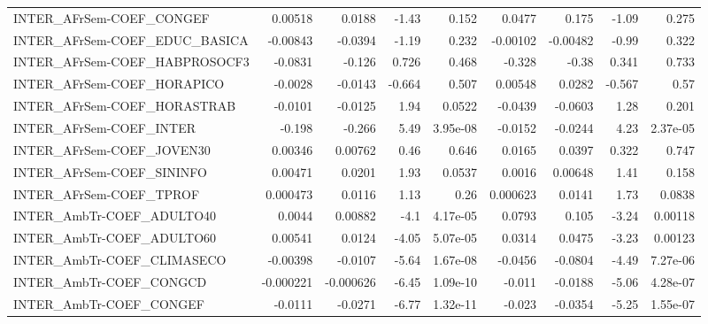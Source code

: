 \begin{tabular}{lrrrrrrrr}
INTER\_AFrSem-COEF\_CONGEF               &     0.00518 &       0.0188 &    -1.43 &    0.152 &     0.0477 &       0.175 &        -1.09 &         0.275 \\
INTER\_AFrSem-COEF\_EDUC\_BASICA          &    -0.00843 &      -0.0394 &    -1.19 &    0.232 &   -0.00102 &    -0.00482 &        -0.99 &         0.322 \\
INTER\_AFrSem-COEF\_HABPROSOCF3          &     -0.0831 &       -0.126 &    0.726 &    0.468 &     -0.328 &       -0.38 &        0.341 &         0.733 \\
INTER\_AFrSem-COEF\_HORAPICO             &     -0.0028 &      -0.0143 &   -0.664 &    0.507 &    0.00548 &      0.0282 &       -0.567 &          0.57 \\
INTER\_AFrSem-COEF\_HORASTRAB            &     -0.0101 &      -0.0125 &     1.94 &   0.0522 &    -0.0439 &     -0.0603 &         1.28 &         0.201 \\
INTER\_AFrSem-COEF\_INTER                &      -0.198 &       -0.266 &     5.49 & 3.95e-08 &    -0.0152 &     -0.0244 &         4.23 &      2.37e-05 \\
INTER\_AFrSem-COEF\_JOVEN30              &     0.00346 &      0.00762 &     0.46 &    0.646 &     0.0165 &      0.0397 &        0.322 &         0.747 \\
INTER\_AFrSem-COEF\_SININFO              &     0.00471 &       0.0201 &     1.93 &   0.0537 &     0.0016 &     0.00648 &         1.41 &         0.158 \\
INTER\_AFrSem-COEF\_TPROF                &    0.000473 &       0.0116 &     1.13 &     0.26 &   0.000623 &      0.0141 &         1.73 &        0.0838 \\
INTER\_AmbTr-COEF\_ADULTO40              &      0.0044 &      0.00882 &     -4.1 & 4.17e-05 &     0.0793 &       0.105 &        -3.24 &       0.00118 \\
INTER\_AmbTr-COEF\_ADULTO60              &     0.00541 &       0.0124 &    -4.05 & 5.07e-05 &     0.0314 &      0.0475 &        -3.23 &       0.00123 \\
INTER\_AmbTr-COEF\_CLIMASECO             &    -0.00398 &      -0.0107 &    -5.64 & 1.67e-08 &    -0.0456 &     -0.0804 &        -4.49 &      7.27e-06 \\
INTER\_AmbTr-COEF\_CONGCD                &   -0.000221 &    -0.000626 &    -6.45 & 1.09e-10 &     -0.011 &     -0.0188 &        -5.06 &      4.28e-07 \\
INTER\_AmbTr-COEF\_CONGEF                &     -0.0111 &      -0.0271 &    -6.77 & 1.32e-11 &     -0.023 &     -0.0354 &        -5.25 &      1.55e-07 \\

\end{tabular}
